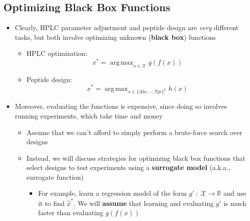 \documentclass[10pt]{article}
\DeclareMathOperator*{\argmax}{arg\,max}
\begin{document}
\subsection*{Optimizing Black Box Functions}
\begin{itemize}
	\item Clearly, HPLC parameter adjustment and peptide design are \textit{very} different tasks, but both involve optimizing unknown (\textbf{black box}) functions
	\begin{itemize}
	    \item HPLC optimization:
	    \[x^* = \argmax_{x \in \mathcal{X}} g\left(f(x)\right)\]
        \item Peptide design:
        \[x^* = \argmax_{x \in \{Ala, \cdots, Tyr\}^k} h(x)\]
    \end{itemize}
    \item Moreover, evaluating the functions is expensive, since doing so involves running experiments, which take time and money
    \begin{itemize}
	    \item Assume that we can't afford to simply perform a brute-force search over designs
	    \item Instead, we will discuss strategies for optimizing black box functions that select designs to test experiments using a \textbf{surrogate model} (a.k.a., surrogate function)
	    \begin{itemize}
	        \item For example, learn a regression model of the form $g'\::\: \mathcal{X} \rightarrow \mathbb{R}$ and use it to find $\hat{x}^*$.  We will \textbf{assume} that learning and evaluating $g'$ is much faster than evaluating $g\left(f(x)\right)$
        \end{itemize}
    \end{itemize}
\end{itemize}
\end{document}
